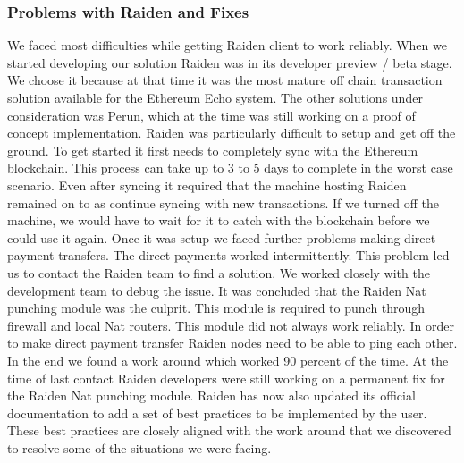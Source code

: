 \subsubsection{Problems with Raiden and Fixes}
We faced most difficulties while getting Raiden client to work reliably. When we started developing our solution Raiden was in its developer preview / beta stage. We choose it because at that time it was the most mature off chain transaction solution available for the Ethereum Echo system. The other solutions under consideration was Perun, which at the time was still working on a proof of concept implementation. Raiden was particularly difficult to setup and get off the ground. To get started it first needs to completely sync with the Ethereum blockchain. This process can take up to 3 to 5 days to complete in the worst case scenario. Even after syncing it required that the machine hosting Raiden remained on to as continue syncing with new transactions. If we turned off the machine, we would have to wait for it to catch with the blockchain before we could use it again.   Once it was setup we faced further problems making direct payment transfers. The direct payments worked intermittently.  This problem led us to contact the Raiden team to find a solution. We worked closely with the development team to debug the issue. It was concluded that the Raiden Nat punching module was the culprit. This module is required to punch through firewall and local Nat routers. This module did not always work reliably. In order to make direct payment transfer Raiden nodes need to be able to ping each other. In the end we found a work around which worked 90 percent of the time. At the time of last contact Raiden developers were still working on a permanent fix for the Raiden Nat punching module. Raiden has now also updated its official documentation \cite{rad:001} to add a set of best practices to be implemented by the user. These best practices are closely aligned with the work around that we discovered to resolve some of the situations we were facing.
\vspace{0.5cm}
